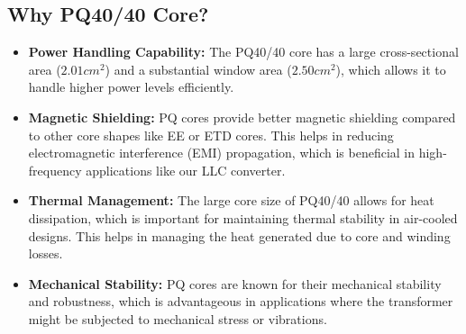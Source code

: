 \subsection{Why PQ40/40 Core?}
\begin{itemize}
    \item \textbf{Power Handling Capability:} The PQ40/40 core has a large cross-sectional area ($2.01 cm^2$) and a substantial window area ($2.50 cm^2$), which allows it to handle higher power levels efficiently.
    \item \textbf{Magnetic Shielding:} PQ cores provide better magnetic shielding compared to other core shapes like EE or ETD cores. This helps in reducing electromagnetic interference (EMI) propagation, which is beneficial in high-frequency applications like our LLC converter.
    \item \textbf{Thermal Management:} The large core size of PQ40/40 allows for heat dissipation, which is important for maintaining thermal stability in air-cooled designs. This helps in managing the heat generated due to core and winding losses.
    \item \textbf{Mechanical Stability:} PQ cores are known for their mechanical stability and robustness, which is advantageous in applications where the transformer might be subjected to mechanical stress or vibrations.
\end{itemize}


